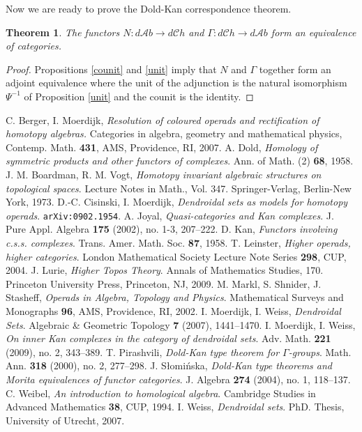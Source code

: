 \documentclass[a4paper]{amsart}
\theoremstyle{plain}
\newtheorem{thm}{Theorem}[section]
\theoremstyle{definition}
\theoremstyle{remark}
\newcommand{\To}{\longrightarrow}
\newcommand{\dCh}{d\mathcal{C}h}
\newcommand{\dAb}{d\mathcal{A}b}
\numberwithin{equation}{section}
\numberwithin{figure}{section}
\begin{document}
Now we are ready to prove the Dold-Kan correspondence theorem.

\begin{thm}\label{dold kan}
 The functors $N\colon \dAb\To \dCh$ and $\Gamma\colon\dCh\To \dAb$ form an equivalence of categories.
\end{thm}
\begin{proof}
Propositions \ref{counit} and \ref{unit} imply that $N$ and $\Gamma$ together form an adjoint equivalence where the unit of the adjunction is the natural isomorphism $\Psi^{-1}$ of Proposition \ref{unit} and the counit is the
identity.
\end{proof}

\begin{thebibliography}{999}
 C. Berger, I. Moerdijk, {\em Resolution of coloured operads and rectification of homotopy
algebras.} Categories in algebra, geometry and mathematical physics, Contemp. Math. {\bf 431}, AMS, Providence, RI, 2007.
 A. Dold, {\em Homology of symmetric products and other functors of complexes}.  Ann. of Math. (2) {\bf 68},
1958.
 J. M. Boardman, R. M. Vogt, \textit{Homotopy invariant
algebraic structures on topological spaces}. Lecture Notes in
Math., Vol. 347. Springer-Verlag, Berlin-New York, 1973.
 D.-C. Cisinski, I. Moerdijk, {\em Dendroidal sets as models for homotopy operads}.
{\tt arXiv:0902.1954}.
 A. Joyal, {\em Quasi-categories and Kan complexes}.
J. Pure Appl. Algebra {\bf 175} (2002), no. 1-3, 207--222.
 D. Kan, {\em Functors involving c.s.s. complexes}. Trans. Amer. Math. Soc. {\bf 87}, 1958.
 T. Leinster, {\em Higher operads, higher categories}. London Mathematical Society Lecture Note Series {\bf
298}, CUP, 2004.
 J. Lurie, {\em Higher Topos Theory}. Annals of Mathematics Studies, 170. Princeton University Press,
Princeton, NJ, 2009.
 M. Markl, S. Shnider, J. Stasheff, {\em Operads in Algebra, Topology and Physics}. Mathematical Surveys
and Monographs {\bf 96}, AMS, Providence, RI, 2002.
 I. Moerdijk, I. Weiss, {\em Dendroidal Sets}. Algebraic \& Geometric Topology {\bf 7} (2007),
1441--1470.
 I. Moerdijk, I. Weiss, {\em On inner Kan complexes in the category of dendroidal sets}.
Adv. Math. {\bf 221} (2009), no. 2, 343--389.
 T. Pirashvili, {\em Dold-Kan type theorem for $\Gamma$-groups}. Math. Ann. {\bf 318} (2000), no. 2, 277--298.
J. S{\l}omi{\'n}ska, {\em Dold-Kan type theorems and Morita equivalences of functor categories}. J. Algebra {\bf 274}
(2004), no. 1, 118--137.
 C. Weibel, {\em An introduction to homological algebra}. Cambridge Studies in Advanced Mathematics
{\bf 38}, CUP, 1994.
 I. Weiss, {\em Dendroidal sets}. PhD. Thesis, University of Utrecht, 2007.
\end{thebibliography}
\end{document}
